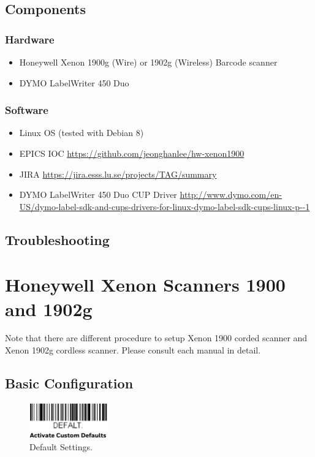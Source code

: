 \documentclass[11pt
  , a4paper
  , article
  , oneside
  , showtrims
]{memoir}
\begin{document}
\clearpage
\section{Components}
\subsection{Hardware}
\begin{itemize}
\item Honeywell Xenon 1900g (Wire) or 1902g (Wireless) Barcode scanner
\item DYMO LabelWriter 450 Duo
\end{itemize}
\subsection{Software}
\begin{itemize}
\item Linux OS (tested with Debian 8) 
\item EPICS IOC  {\tiny \url{https://github.com/jeonghanlee/hw-xenon1900}}
\item JIRA {\tiny \url{https://jira.esss.lu.se/projects/TAG/summary}}
\item DYMO LabelWriter 450 Duo CUP Driver \newline
  {\tiny
  \url{http://www.dymo.com/en-US/dymo-label-sdk-and-cups-drivers-for-linux-dymo-label-sdk-cups-linux-p--1}}
\end{itemize}

\section{Troubleshooting}


\newpage
\chapter{Honeywell Xenon Scanners 1900 and 1902g}
Note that there are different procedure to setup Xenon 1900 corded scanner and Xenon 1902g cordless scanner. Please consult each manual in detail.


\section{Basic Configuration}
\begin{figure}[!htb]
  \includegraphics[width=0.3\textwidth]{./pictures/scanner_settings_default.eps}
  \caption{
            Default Settings.
          }
  \label{fig:default}   
\end{figure}
\end{document}
